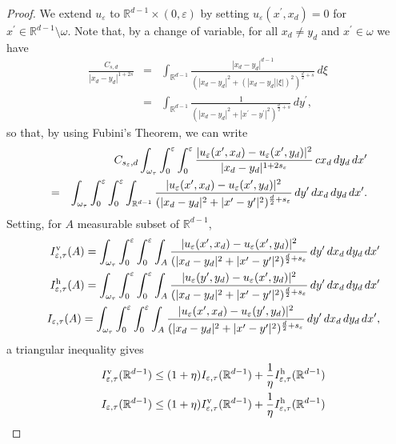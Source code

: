\documentclass[11pt]{article}
\def\e{\varepsilon}
\begin{document}
\begin{proof} 
We extend $u_\e$ to $\mathbb R^{d-1}\times(0,\e)$ by setting $u_\e(x^\prime,x_d)=0$ for $x^\prime\in\mathbb R^{d-1}\setminus\omega$. 
Note that, by a change of variable, 
for all $x_d\neq y_d$ and $x^\prime\in\omega$ 
we have 
\begin{eqnarray}
\frac{C_{s,d}}{|x_d-y_d|^{1+2s}}&=&
\int_{\mathbb R^{d-1}} \frac{|x_d-y_d|^{d-1}}{(|x_d-y_d|^2+(|x_d-y_d||\xi|)^2)^{\frac{d}{2}+s}}\, d\xi\nonumber\\
&=&
\int_{\mathbb R^{d-1}} \frac{1}{(|x_d-y_d|^2+|x^\prime-y^\prime|^2)^{\frac{d}{2}+s}}\, dy^\prime,\label{rd1}
\end{eqnarray} 
so that, by using Fubini's Theorem, we can write  
\begin{eqnarray}
&&\hspace{-2cm}C_{s_\e,d}\int_{\omega_\tau}\int_0^\e\int_0^\e\frac{|u_\e(x^\prime, x_d)-u_\e(x^\prime, y_d)|^2}{|x_d-y_d|^{1+2s_\e}}\, cx_d\, dy_d\, dx^\prime\nonumber\\
&=&
\int_{\omega_\tau}\int_0^\e\int_0^\e\int_{\mathbb R^{d-1}} \frac{|u_\e(x^\prime, x_d)-u_\e(x^\prime, y_d)|^2}{(|x_d-y_d|^2+|x^\prime-y^\prime|^2)^{\frac{d}{2}+s_\e}}\, dy^\prime\, dx_d\, dy_d\, dx^\prime.\label{cvar}
\end{eqnarray}
Setting, for $A$ measurable subset of $\mathbb R^{d-1}$, 
\begin{eqnarray*}
&&I^{\rm v}_{\e,\tau}(A)=\int_{\omega_\tau}\int_0^\e\int_0^\e\int_A \frac{|u_\e(x^\prime, x_d)-u_\e(x^\prime, y_d)|^2}{(|x_d-y_d|^2+|x^\prime-y^\prime|^2)^{\frac{d}{2}+s_\e}}\, dy^\prime\, dx_d\, dy_d\, dx^\prime\\ 
&&I^{\rm h}_{\e,\tau}(A)=\int_{\omega_\tau}\int_0^\e\int_0^\e\int_A \frac{|u_\e(y^\prime, y_d)-u_\e(x^\prime, y_d)|^2}{(|x_d-y_d|^2+|x^\prime-y^\prime|^2)^{\frac{d}{2}+s_\e}}\, dy^\prime\, dx_d\, dy_d\, dx^\prime  \\
&&I_{\e,\tau}(A)= \int_{\omega_\tau}\int_0^\e\int_0^\e\int_A\frac{|u_\e(x^\prime, x_d)-u_\e(y^\prime, y_d)|^2}{(|x_d-y_d|^2+|x^\prime-y^\prime|^2)^{\frac{d}{2}+s_\e}}\, dy^\prime\, dx_d\, dy_d\, dx^\prime, 
\end{eqnarray*}
a triangular inequality gives 
\begin{eqnarray}
&&I_{\e,\tau}^{\rm v}(\mathbb R^{d-1})\leq (1+\eta)I_{\e,\tau}(\mathbb R^{d-1})+\frac{1}{\eta}I_{\e,\tau}^{\rm h}(\mathbb R^{d-1})\label{tr1}\\
&&I_{\e,\tau}(\mathbb R^{d-1})\leq (1+\eta)I_{\e,\tau}^{\rm v}(\mathbb R^{d-1})+\frac{1}{\eta}I_{\e,\tau}^{\rm h}(\mathbb R^{d-1})\label{tr2}

\end{eqnarray}
\end{proof}
\end{document}
